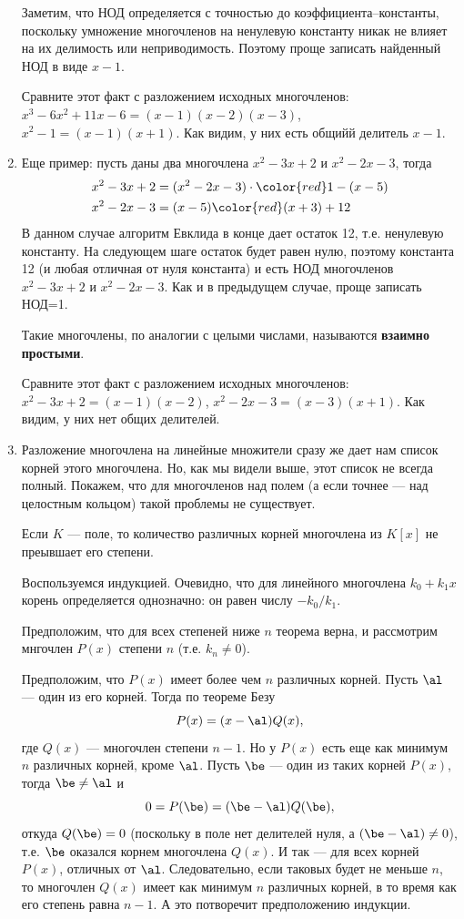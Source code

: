 \begin{enumerate}
Заметим, что НОД определяется с точностью до коэффициента--константы, поскольку умножение многочленов на ненулевую константу никак не влияет на их делимость или неприводимость. Поэтому проще записать найденный НОД в виде $x-1$.

Сравните этот факт с разложением исходных многочленов: $x^3-6x^2+11x-6=(x-1)(x-2)(x-3)$, $x^2-1=(x-1)(x+1)$. Как видим, у них есть общийй делитель $x-1$.

\item Еще пример: пусть даны два многочлена $x^2-3x+2$ и $x^2-2x-3$, тогда
\begin{align*}
x^2-3x+2 & = (x^2-2x-3)\cdot{\color{red}1} - (x-5) \\
x^2-2x-3 & = (x-5){\color{red}(x+3)} + 12
\end{align*}
В данном случае алгоритм Евклида в конце дает остаток 12, т.е. ненулевую константу. На следующем шаге остаток будет равен нулю, поэтому константа 12 (и любая отличная от нуля константа) и есть НОД многочленов $x^2-3x+2$ и $x^2-2x-3$. Как и в предыдущем случае, проще записать НОД=1.

Такие многочлены, по аналогии с целыми числами, называются \textbf{взаимно простыми}.

Сравните этот факт с разложением исходных многочленов: $x^2-3x+2=(x-1)(x-2)$, $x^2-2x-3=(x-3)(x+1)$. Как видим, у них нет общих делителей.


\item Разложение многочлена на линейные множители сразу же дает нам список корней этого многочлена. Но, как мы видели выше, этот список не всегда полный. Покажем, что для многочленов над полем (а если точнее --- над целостным кольцом) такой проблемы не существует.
\begin{thrm}
Если $K$ --- поле, то количество различных корней многочлена из $K[x]$ не преывшает его степени.
\end{thrm}
\pf
Воспользуемся индукцией. Очевидно, что для линейного многочлена $k_0+k_1x$ корень определяется однозначно: он равен числу $-k_0/k_1$.

Предположим, что для всех степеней ниже $n$ теорема верна, и рассмотрим мнгочлен $P(x)$ степени $n$ (т.е. $k_n\ne 0$).

Предположим, что $P(x)$ имеет более чем $n$ различных корней. Пусть $\al$ --- один из его корней. Тогда по теореме Безу
\begin{equation}\label{PQ}
P(x)=(x-\al)Q(x),
\end{equation}
где $Q(x)$ --- многочлен степени $n-1$. Но у $P(x)$ есть еще как минимум $n$ различных корней, кроме $\al$. Пусть $\be$ --- один из таких корней $P(x)$, тогда $\be\ne\al$ и
$$
0=P(\be)=(\be-\al)Q(\be),
$$
откуда $Q(\be)=0$ (поскольку в поле нет делителей нуля, а $(\be-\al)\ne 0$),
т.е. $\be$ оказался корнем многочлена $Q(x)$. И так --- для всех корней $P(x)$, отличных от $\al$. Следовательно, если таковых будет не меньше $n$, то многочлен $Q(x)$ имеет как минимум $n$ различных корней, в то время как его степень равна $n-1$. А это потворечит предположению индукции.


\end{enumerate}
